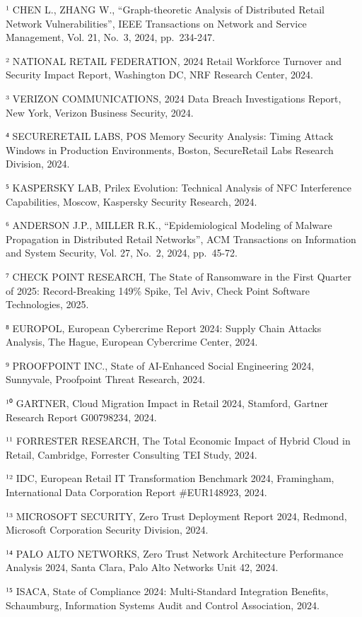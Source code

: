 \documentclass[12pt,a4paper,oneside]{book}
\numberwithin{figure}{chapter} %
\numberwithin{table}{chapter}  %
\begin{document}
¹ CHEN L., ZHANG W., ``Graph-theoretic Analysis of Distributed Retail
Network Vulnerabilities'', IEEE Transactions on Network and Service
Management, Vol. 21, No.~3, 2024, pp.~234-247.

² NATIONAL RETAIL FEDERATION, 2024 Retail Workforce Turnover and
Security Impact Report, Washington DC, NRF Research Center, 2024.

³ VERIZON COMMUNICATIONS, 2024 Data Breach Investigations Report, New
York, Verizon Business Security, 2024.

⁴ SECURERETAIL LABS, POS Memory Security Analysis: Timing Attack Windows
in Production Environments, Boston, SecureRetail Labs Research Division,
2024.

⁵ KASPERSKY LAB, Prilex Evolution: Technical Analysis of NFC
Interference Capabilities, Moscow, Kaspersky Security Research, 2024.

⁶ ANDERSON J.P., MILLER R.K., ``Epidemiological Modeling of Malware
Propagation in Distributed Retail Networks'', ACM Transactions on
Information and System Security, Vol. 27, No.~2, 2024, pp.~45-72.

⁷ CHECK POINT RESEARCH, The State of Ransomware in the First Quarter of
2025: Record-Breaking 149\% Spike, Tel Aviv, Check Point Software
Technologies, 2025.

⁸ EUROPOL, European Cybercrime Report 2024: Supply Chain Attacks
Analysis, The Hague, European Cybercrime Center, 2024.

⁹ PROOFPOINT INC., State of AI-Enhanced Social Engineering 2024,
Sunnyvale, Proofpoint Threat Research, 2024.

¹⁰ GARTNER, Cloud Migration Impact in Retail 2024, Stamford, Gartner
Research Report G00798234, 2024.

¹¹ FORRESTER RESEARCH, The Total Economic Impact of Hybrid Cloud in
Retail, Cambridge, Forrester Consulting TEI Study, 2024.

¹² IDC, European Retail IT Transformation Benchmark 2024, Framingham,
International Data Corporation Report \#EUR148923, 2024.

¹³ MICROSOFT SECURITY, Zero Trust Deployment Report 2024, Redmond,
Microsoft Corporation Security Division, 2024.

¹⁴ PALO ALTO NETWORKS, Zero Trust Network Architecture Performance
Analysis 2024, Santa Clara, Palo Alto Networks Unit 42, 2024.

¹⁵ ISACA, State of Compliance 2024: Multi-Standard Integration Benefits,
Schaumburg, Information Systems Audit and Control Association, 2024.
\end{document}
